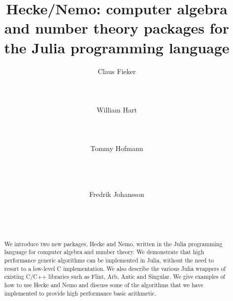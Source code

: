 \documentclass{sig-alternate-05-2015}
\begin{document}

\newtheorem{alg}{Algorithm}
\newtheorem{definition}{Definition}
\newtheorem{Assertion}{Assertion}

\makeatletter
\def\Ddots{\mathinner{\mkern1mu\raise\p@
\vbox{\kern7\p@\hbox{.}}\mkern2mu
\raise4\p@\hbox{.}\mkern2mu\raise7\p@\hbox{.}\mkern1mu}}
\makeatother

\title{Hecke/Nemo: computer algebra and number theory packages for the Julia programming language}

\author{
\alignauthor Claus Fieker\\
   \\
   \\
   \\
\alignauthor William Hart\\
   \\
   \\
   \\
\alignauthor Tommy Hofmann\\
   \\
   \\
   \\
\and
\alignauthor Fredrik Johansson\\
   \\
    \\
   \\
}

\maketitle

\begin{abstract}
We introduce two new packages, Hecke and Nemo, written in the Julia programming language
for computer algebra and number theory.
We demonstrate that high performance generic
algorithms can be implemented in Julia, without the need to resort to a low-level C
implementation. We also describe the various Julia wrappers of existing C/C++ libraries
such as Flint, Arb, Antic and Singular. We give examples of how to use Hecke and Nemo and discuss
some of the algorithms that we have implemented to provide high performance basic
arithmetic.
\end{abstract}
\end{document}
